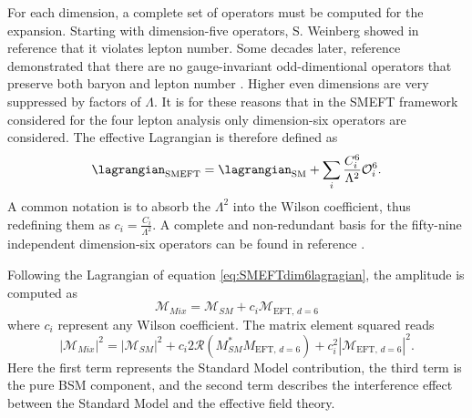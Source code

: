 For each dimension, a complete set of operators must be computed for the expansion. Starting with dimension-five operators, S. Weinberg showed in reference \cite{Weinberg_1979} that it violates lepton number. Some decades later, reference \cite{de_Gouv_a_2014} demonstrated that there are no \SMgroup gauge-invariant odd-dimentional operators that preserve both baryon and lepton number \cite{Kobach_2016}. Higher even dimensions are very suppressed by factors of $\Lambda$. It is for these reasons that in the SMEFT framework considered for the four lepton analysis only dimension-six operators are considered. The effective Lagrangian is therefore defined as 
\begin{equation} \label{eq:SMEFTdim6lagragian}
    \lagrangian_{\text{SMEFT}}=\lagrangian_{\text{SM}} + \sum_{i}\dfrac{C_i^6}{\Lambda^{2}}\mathcal{O}_i^6.
\end{equation}
A common notation is to absorb the $\Lambda^2$ into the Wilson coefficient, thus redefining them as $c_i=\frac{C_i}{\Lambda^2}$. A complete and non-redundant basis for the fifty-nine independent dimension-six operators can be found in reference \cite{Grzadkowski_2010}.


Following the Lagrangian of equation \ref{eq:SMEFTdim6lagragian}, the amplitude is computed as
\begin{equation}
\mathcal M_{Mix} = \mathcal M_{SM} + c_i \mathcal M_{\text{EFT, }d=6}
\end{equation}
where $c_i$ represent any Wilson coefficient. The matrix element squared reads
\begin{equation}\label{eq:EFTamplitude}
 \left | \mathcal  M_{Mix} \right |^2  = 
\left |  \mathcal M_{SM} \right |^2 +
c_i 2 \mathcal R \left ( M_{SM}^{*} M_{\text{EFT, }d=6} \right) +
c_i^2  \left |  \mathcal M_{\text{EFT, }d=6} \right |^2. 
\end{equation}
Here the first term represents the Standard Model contribution, the third term is the pure BSM component, and the second term describes the interference effect between the Standard Model and the effective field theory. 

